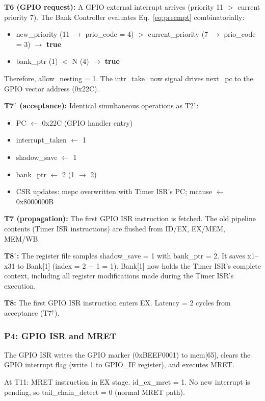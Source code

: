 \documentclass[letterpaper,journal]{IEEEtran}
\begin{document}
\textbf{T6 (GPIO request):} A GPIO external interrupt arrives (priority 11 $>$ current priority 7). The Bank Controller evaluates Eq.~\ref{eq:preempt} combinatorially:
\begin{itemize}
\item new\_priority (11 $\rightarrow$ prio\_code = 4) $>$ current\_priority (7 $\rightarrow$ prio\_code = 3) $\rightarrow$ \textbf{true}
\item bank\_ptr (1) $<$ N (4) $\rightarrow$ \textbf{true}
\end{itemize}
Therefore, allow\_nesting = 1. The intr\_take\_now signal drives next\_pc to the GPIO vector address (0x22C).

\textbf{T7$^\uparrow$ (acceptance):} Identical simultaneous operations as T2$^\uparrow$:
\begin{itemize}
\item PC $\leftarrow$ 0x22C (GPIO handler entry)
\item interrupt\_taken $\leftarrow$ 1
\item shadow\_save $\leftarrow$ 1
\item bank\_ptr $\leftarrow$ 2 (1 $\rightarrow$ 2)
\item CSR updates: mepc overwritten with Timer ISR's PC; mcause $\leftarrow$ 0x8000000B
\end{itemize}

\textbf{T7 (propagation):} The first GPIO ISR instruction is fetched. The old pipeline contents (Timer ISR instructions) are flushed from ID/EX, EX/MEM, MEM/WB.

\textbf{T8$^\uparrow$:} The register file samples shadow\_save = 1 with bank\_ptr = 2. It saves x1--x31 to Bank[1] (index = 2 $-$ 1 = 1). Bank[1] now holds the Timer ISR's complete context, including all register modifications made during the Timer ISR's execution.

\textbf{T8:} The first GPIO ISR instruction enters EX. Latency = 2 cycles from acceptance (T7$^\uparrow$).

\subsubsection{P4: GPIO ISR and MRET}

The GPIO ISR writes the GPIO marker (0xBEEF0001) to mem[65], clears the GPIO interrupt flag (write 1 to GPIO\_IF register), and executes MRET.

At T11: MRET instruction in EX stage. id\_ex\_mret = 1. No new interrupt is pending, so tail\_chain\_detect = 0 (normal MRET path).
\end{document}
